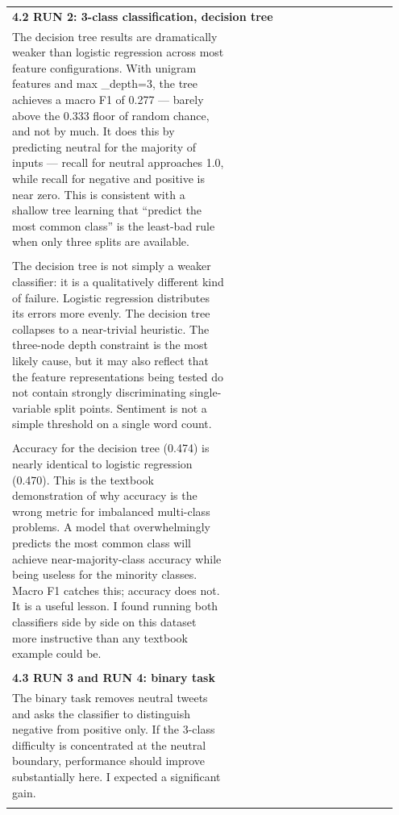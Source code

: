 \documentclass[11pt]{article}
\begin{document}
\begin{longtable}{|p{0.55\linewidth}|p{0.40\linewidth}|}
\hline
\rule{0pt}{3.5cm} & \\
\hline
\multicolumn{2}{|l|}{\textbf{4.2 RUN 2: 3-class classification, decision tree}} \\[2pt]
\hline
The decision tree results are dramatically weaker than logistic regression across most feature configurations. With unigram features and max \_depth=3, the tree achieves a macro F1 of 0.277 --- barely above the 0.333 floor of random chance, and not by much. It does this by predicting neutral for the majority of inputs --- recall for neutral approaches 1.0, while recall for negative and positive is near zero. This is consistent with a shallow tree learning that ``predict the most common class'' is the least-bad rule when only three splits are available. & \\[2pt]
\hline
\rule{0pt}{3.5cm} & \\
\hline
The decision tree is not simply a weaker classifier: it is a qualitatively different kind of failure. Logistic regression distributes its errors more evenly. The decision tree collapses to a near-trivial heuristic. The three-node depth constraint is the most likely cause, but it may also reflect that the feature representations being tested do not contain strongly discriminating single-variable split points. Sentiment is not a simple threshold on a single word count. & \\[2pt]
\hline
\rule{0pt}{3.5cm} & \\
\hline
Accuracy for the decision tree (0.474) is nearly identical to logistic regression (0.470). This is the textbook demonstration of why accuracy is the wrong metric for imbalanced multi-class problems. A model that overwhelmingly predicts the most common class will achieve near-majority-class accuracy while being useless for the minority classes. Macro F1 catches this; accuracy does not. It is a useful lesson. I found running both classifiers side by side on this dataset more instructive than any textbook example could be. & \\[2pt]
\hline
\rule{0pt}{3.5cm} & \\
\hline
\multicolumn{2}{|l|}{\textbf{4.3 RUN 3 and RUN 4: binary task}} \\[2pt]
\hline
The binary task removes neutral tweets and asks the classifier to distinguish negative from positive only. If the 3-class difficulty is concentrated at the neutral boundary, performance should improve substantially here. I expected a significant gain. & \\[2pt]
\hline
\rule{0pt}{3.5cm} & \\

\end{longtable}
\end{document}
